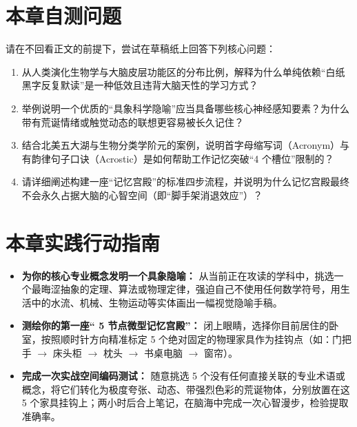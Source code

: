 \documentclass[12pt,a4paper,openany]{ctexbook}
\begin{document}
\section*{本章自测问题}
请在不回看正文的前提下，尝试在草稿纸上回答下列核心问题：
\begin{enumerate}
    \item 从人类演化生物学与大脑皮层功能区的分布比例，解释为什么单纯依赖“白纸黑字反复默读”是一种低效且违背大脑天性的学习方式？
    \item 举例说明一个优质的“具象科学隐喻”应当具备哪些核心神经感知要素？为什么带有荒诞情绪或触觉动态的联想更容易被长久记住？
    \item 结合北美五大湖与生物分类学阶元的案例，说明首字母缩写词（Acronym）与有韵律句子口诀（Acrostic）是如何帮助工作记忆突破“4 个槽位”限制的？
    \item 请详细阐述构建一座“记忆宫殿”的标准四步流程，并说明为什么记忆宫殿最终不会永久占据大脑的心智空间（即“脚手架消退效应”）？
\end{enumerate}

\section*{本章实践行动指南}
\begin{practicebox}[本周记忆黑客刻意练习清单]
\begin{itemize}
    \item[$\square$] \textbf{为你的核心专业概念发明一个具象隐喻：} 从当前正在攻读的学科中，挑选一个最晦涩抽象的定理、算法或物理定律，强迫自己不使用任何数学符号，用生活中的水流、机械、生物运动等实体画出一幅视觉隐喻手稿。
    \item[$\square$] \textbf{测绘你的第一座“ 5 节点微型记忆宫殿”：} 闭上眼睛，选择你目前居住的卧室，按照顺时针方向精准标定 5 个绝对固定的物理家具作为挂钩点（如：门把手 $\rightarrow$ 床头柜 $\rightarrow$ 枕头 $\rightarrow$ 书桌电脑 $\rightarrow$ 窗帘）。
    \item[$\square$] \textbf{完成一次实战空间编码测试：} 随意挑选 5 个没有任何直接关联的专业术语或概念，将它们转化为极度夸张、动态、带强烈色彩的荒诞物体，分别放置在这 5 个家具挂钩上；两小时后合上笔记，在脑海中完成一次心智漫步，检验提取准确率。
\end{itemize}
\end{practicebox}


\end{document}
